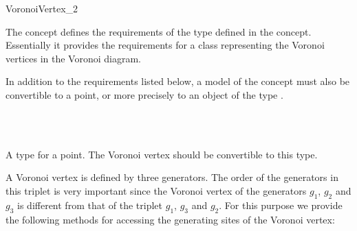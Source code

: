 


\begin{ccRefConcept}{VoronoiVertex_2}

\ccDefinition

The concept  defines the requirements of the
 type defined in the 
concept. Essentially it provides the requirements for a class
representing the Voronoi vertices in the Voronoi diagram.

In addition to the requirements listed below, a model of the
 concept must also be convertible to a
point, or more precisely to an object of the type
.


\ccRefines
{}\\
\\

\ccTypes
{}
%
\ccGlue
{}
{}
{A type for a point. The Voronoi vertex should be convertible to this
  type.}




A Voronoi vertex is defined by three generators. The order of the
generators in this triplet is very important since the Voronoi vertex
of the generators $g_1$, $g_2$ and $g_3$ is different from that of the
triplet $g_1$, $g_3$ and $g_2$. For this purpose we provide the
following methods for accessing the generating sites of the Voronoi
vertex:


\end{ccRefConcept}
